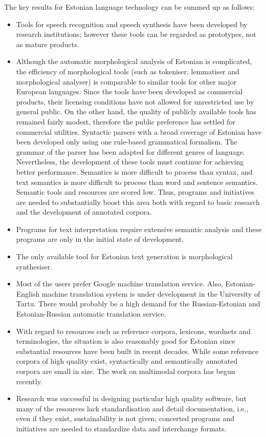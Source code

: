 \begin{multicols}{2}
The key results for Estonian language technology can be summed up as follows:

\begin{itemize}
\item Tools for speech recognition and speech synthesis have been developed by research institutions; however these tools can be regarded as prototypes, not as mature products.
\item Although the automatic morphological analysis of Estonian is complicated, the efficiency of morphological tools (such as tokeniser, lemmatiser and morphological analyser) is comparable to similar tools for other major European languages. Since the tools have been developed as commercial products, their licensing conditions have not allowed for unrestricted use by general public. On the other hand, the quality of publicly available tools has remained fairly modest, therefore the public preference has settled for commercial utilities.
Syntactic parsers with a broad coverage of Estonian have been developed only using one rule-based grammatical formalism. The grammar of the parser has been adapted for different genres of language. Nevertheless, the development of these tools must continue for achieving better performance.
Semantics is more difficult to process than syntax, and text semantics is more difficult to process than word and sentence semantics. 
Semantic tools and resources are scored low. 
Thus, programs and initiatives are needed to substantially boost this area both with regard to basic research and the development of annotated corpora.
\item Programs for text interpretation require extensive semantic analysis and these programs are only in the initial state of development. 
\item The only available tool for Estonian text generation is morphological synthesiser.
\item Most of the users prefer Google machine translation service. Also, Estonian-English machine translation system is under development in the University of Tartu. There would probably be a high demand for the Russian-Estonian and Estonian-Russian automatic translation service.
\item With regard to resources such as reference corpora, lexicons, wordnets and terminologies, the situation is also reasonably good for Estonian since substantial resources have been built in recent decades. While some reference corpora of high quality exist, syntactically and semantically annotated corpora are small in size. The work on multimodal corpora has begun recently.
\item Research was successful in designing particular high quality software, but many of the resources lack standardisation and detail documentation, i.e., even if they exist, sustainability is not given; concerted programs and initiatives are needed to standardize data and interchange formats.


\end{itemize}
\end{multicols}

